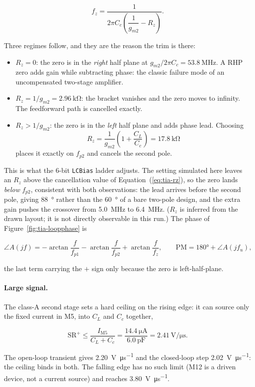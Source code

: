 \begin{equation}\label{eq:tia-zero}
  f_z = \frac{1}{2\pi C_c \left( \dfrac{1}{g_{m2}} - R_z \right)} .
\end{equation}

Three regimes follow, and they are the reason the trim is there:

\begin{itemize}
\item $R_z = 0$: the zero is in the \emph{right} half plane at
$g_{m2}/2\pi C_c = \SI{53.8}{\mega\hertz}$. A RHP zero adds gain while subtracting
phase: the classic failure mode of an uncompensated two-stage amplifier.
\item $R_z = 1/g_{m2} = \SI{2.96}{\kilo\ohm}$: the bracket vanishes and the zero moves
to infinity. The feedforward path is cancelled exactly.
\item $R_z > 1/g_{m2}$: the zero is in the \emph{left} half plane and adds phase lead.
Choosing
\begin{equation}\label{eq:tia-rz}
  R_z = \frac{1}{g_{m2}}\left(1 + \frac{C_L}{C_c}\right) = \SI{17.8}{\kilo\ohm}
\end{equation}
places it exactly on $f_{p2}$ and cancels the second pole.
\end{itemize}

This is what the 6-bit \texttt{LCBias} ladder adjusts. The setting simulated here leaves
an $R_z$ above the cancellation value of Equation~(\ref{eq:tia-rz}), so the zero lands
\emph{below} $f_{p2}$, consistent with both observations: the lead arrives before the
second pole, giving \SI{88}{\degree} rather than the \SI{60}{\degree} of a bare two-pole
design, and the extra gain pushes the crossover from \SI{5.0}{\mega\hertz} to
\SI{6.4}{\mega\hertz}. ($R_z$ is inferred from the drawn layout; it is not directly
observable in this run.) The phase of Figure~\ref{fig:tia-loopphase} is

\begin{equation}\label{eq:tia-phase}
  \angle A(jf) = -\arctan\frac{f}{f_{p1}} - \arctan\frac{f}{f_{p2}}
                 + \arctan\frac{f}{f_z},
  \qquad
  \mathrm{PM} = \ang{180} + \angle A(jf_u),
\end{equation}

the last term carrying the $+$ sign only because the zero is left-half-plane.

\paragraph{Large signal.}
The class-A second stage sets a hard ceiling on the rising edge: it can source only the
fixed current in M5, into $C_L$ and $C_c$ together,

\begin{equation}\label{eq:tia-slew}
  \mathrm{SR}^{+} \le \frac{I_{\mathrm{M5}}}{C_L + C_c}
  = \frac{\SI{14.4}{\micro\ampere}}{\SI{6.0}{\pico\farad}}
  = \SI{2.41}{\volt\per\micro\second}.
\end{equation}

The open-loop transient gives \SI{2.20}{\volt\per\micro\second} and the closed-loop step
\SI{2.02}{\volt\per\micro\second}: the ceiling binds in both. The falling edge has no
such limit (M12 is a driven device, not a current source) and reaches
\SI{3.80}{\volt\per\micro\second}.
